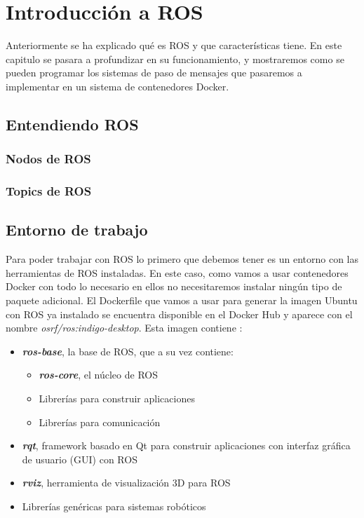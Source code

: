 \chapter{Introducción a ROS}
Anteriormente se ha explicado qué es ROS y que características tiene. En este capitulo se pasara a profundizar en su funcionamiento, y mostraremos como se pueden programar los sistemas de paso de mensajes que pasaremos a implementar en un sistema de contenedores Docker.

	\section{Entendiendo ROS}
		
		\subsection{Nodos de ROS}
		
		\subsection{Topics de ROS}
	
	\section{Entorno de trabajo}
	Para poder trabajar con ROS lo primero que debemos tener es un entorno con las herramientas de ROS instaladas. En este caso, como vamos a usar contenedores Docker con todo lo necesario en ellos no necesitaremos instalar ningún tipo de paquete adicional. El Dockerfile que vamos a usar para generar la imagen Ubuntu con ROS ya instalado se encuentra disponible en el Docker Hub y aparece con el nombre \emph{osrf/ros:indigo-desktop}. Esta imagen contiene \cite{ros-installation}:
	\begin{itemize}
		\item \emph{\textbf{ros-base}}, la base de ROS, que a su vez contiene:
		\begin{itemize}
			\item \emph{\textbf{ros-core}}, el núcleo de ROS
			\item Librerías para construir aplicaciones
			\item Librerías para comunicación
		\end{itemize}
		\item \emph{\textbf{rqt}}, framework basado en Qt para construir aplicaciones con interfaz gráfica de usuario (GUI) con ROS
		\item \emph{\textbf{rviz}}, herramienta de visualización 3D para ROS
		\item Librerías genéricas para sistemas robóticos
		
	\end{itemize}
	
